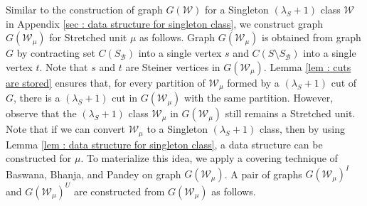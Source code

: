 \documentclass[letterpaper,11pt]{article}
\begin{document}
Similar to the construction of graph $G({\mathcal W})$ for a Singleton $(\lambda_S+1)$ class ${\mathcal W}$ in Appendix \ref{sec : data structure for singleton class}, we construct graph $G({\mathcal W}_{\mu})$ for Stretched unit $\mu$ as follows. Graph $G({\mathcal W}_{\mu})$ is obtained from graph $G$ by contracting set $C(S_{\mathcal B})$ into a single vertex $s$ and $C(S\setminus S_{\mathcal B})$ into a single vertex $t$. Note that $s$ and $t$ are Steiner vertices in $G({\mathcal W}_{\mu})$. Lemma \ref{lem : cuts are stored} ensures that, for every partition of ${\mathcal W}_{\mu}$ formed by a $(\lambda_S+1)$ cut of $G$, there is a $(\lambda_S+1)$ cut in $G({\mathcal W}_{\mu})$ with the same partition. However, observe that the $(\lambda_S+1)$ class ${\mathcal W}_{\mu}$ in $G({\mathcal W}_{\mu})$ still remains a Stretched unit. Note that if we can convert ${\mathcal W}_{\mu}$ to a Singleton $(\lambda_S+1)$ class, then by using Lemma \ref{lem : data structure for singleton class}, a data structure can be constructed for $\mu$. To materialize this idea, we apply a covering technique of Baswana, Bhanja, and Pandey \cite{DBLP:journals/talg/BaswanaBP23} on graph $G({\mathcal W}_{\mu})$. A pair of graphs  $G({\mathcal W}_{\mu})^I$ and $G({\mathcal W}_{\mu})^U$ are constructed from $G({\mathcal W}_{\mu})$ as follows.\\
\end{document}
